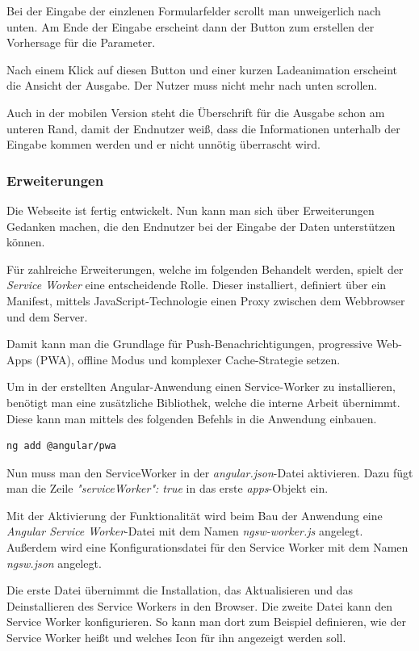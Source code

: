 Bei der Eingabe der einzlenen Formularfelder scrollt man unweigerlich nach unten. Am Ende der Eingabe erscheint dann der
Button zum erstellen der Vorhersage für die Parameter.

Nach einem Klick auf diesen Button und einer kurzen Ladeanimation erscheint die Ansicht der Ausgabe. Der Nutzer muss
nicht mehr nach unten scrollen.

Auch in der mobilen Version steht die Überschrift für die Ausgabe schon am unteren Rand, damit der Endnutzer weiß, dass
die Informationen unterhalb der Eingabe kommen werden und er nicht unnötig überrascht wird.

\subsubsection{Erweiterungen}
Die Webseite ist fertig entwickelt. Nun kann man sich über Erweiterungen Gedanken machen, die den Endnutzer bei der
Eingabe der Daten unterstützen können.

Für zahlreiche Erweiterungen, welche im folgenden Behandelt werden, spielt der \textit{Service Worker} eine
entscheidende Rolle. Dieser installiert, definiert über ein Manifest, mittels JavaScript-Technologie einen Proxy
zwischen dem Webbrowser und dem Server.

Damit kann man die Grundlage für Push-Benachrichtigungen, progressive Web-Apps (PWA), offline Modus und komplexer
Cache-Strategie setzen.

Um in der erstellten Angular-Anwendung einen Service-Worker zu installieren, benötigt man eine zusätzliche Bibliothek,
welche die interne Arbeit übernimmt. Diese kann man mittels des folgenden Befehls in die Anwendung einbauen.

\begin{lstlisting}[language=bash, caption=Hinzufügen der PWA-Bibliothek, label=ls:umsetzung_angularaddpwa]
    ng add @angular/pwa
\end{lstlisting}

Nun muss man den ServiceWorker in der \textit{angular.json}-Datei aktivieren. Dazu fügt man die Zeile
\textit{"serviceWorker": true} in das erste \textit{apps}-Objekt ein.

Mit der Aktivierung der Funktionalität wird beim Bau der Anwendung eine \textit{Angular Service Worker}-Datei mit dem
Namen \textit{ngsw-worker.js} angelegt. Außerdem wird eine Konfigurationsdatei für den Service Worker mit dem Namen
\textit{ngsw.json} angelegt.

Die erste Datei übernimmt die Installation, das Aktualisieren und das Deinstallieren des Service Workers in den Browser.
Die zweite Datei kann den Service Worker konfigurieren. So kann man dort zum Beispiel definieren, wie der Service Worker
heißt und welches Icon für ihn angezeigt werden soll.

